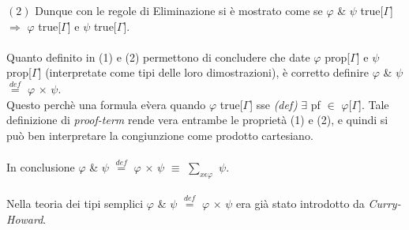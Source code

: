 \noindent
\textbf{$(2)$} Dunque con le regole di Eliminazione si \`e mostrato come se $\varphi$ \& $\psi$ true[$\Gamma$] $\Rightarrow$ $\varphi$ true[$\Gamma$] e $\psi$ true[$\Gamma$].
\\\\
\noindent
Quanto definito in (1) e (2) permettono di concludere che date $\varphi$ prop[$\Gamma$] e $\psi$ prop[$\Gamma$] (interpretate come tipi delle loro dimostrazioni), \`e corretto definire  $\varphi$ \& $\psi$ ${\overset{\mathit{def}}{=}}$ $\varphi$ $\times$ $\psi$.\\
Questo  perch\`e una formula e\`vera quando
$\varphi$ true[$\Gamma$] sse \textit{(def)} $\exists$ pf $\in$ $\varphi$[$\Gamma$]. Tale definizione di \textit{proof-term} rende vera entrambe le propriet\`a (1) e (2), e quindi si pu\`o ben interpretare la congiunzione come prodotto cartesiano.
\\\\
\noindent 
In conclusione $\varphi$ \& $\psi$ ${\overset{\mathit{def}}{=}}$  $\varphi$ $\times$ $\psi$ $\equiv$ $\sum\limits_{x \epsilon \varphi}$ $\psi$.\\\\
\noindent
Nella teoria dei tipi semplici $\varphi$ \& $\psi$ ${\overset{\mathit{def}}{=}}$ $\varphi$ $\times$ $\psi$ era gi\`a stato introdotto da \textit{Curry-Howard}.